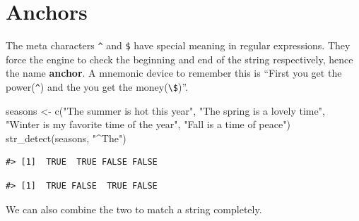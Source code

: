 \documentclass[
]{krantz}
\makeatletter
\newenvironment{Shaded}{\begin{snugshade}}{\end{snugshade}}
\newcommand{\FunctionTok}[1]{\textcolor[rgb]{0.00,0.00,0.00}{#1}}
\newcommand{\NormalTok}[1]{#1}
\newcommand{\OtherTok}[1]{\textcolor[rgb]{0.56,0.35,0.01}{#1}}
\newcommand{\StringTok}[1]{\textcolor[rgb]{0.31,0.60,0.02}{#1}}
\newenvironment{kframe}{%
\medskip{}
\setlength{\fboxsep}{.8em}
 \def\at@end@of@kframe{}%
 \ifinner\ifhmode%
  \def\at@end@of@kframe{\end{minipage}}%
  \begin{minipage}{\columnwidth}%
 \fi\fi%
 \def\FrameCommand##1{\hskip\@totalleftmargin \hskip-\fboxsep
 \colorbox{shadecolor}{##1}\hskip-\fboxsep
     \hskip-\linewidth \hskip-\@totalleftmargin \hskip\columnwidth}%
 \MakeFramed {\advance\hsize-\width
   \@totalleftmargin\z@ \linewidth\hsize
   \@setminipage}}%
 {\par\unskip\endMakeFramed%
 \at@end@of@kframe}
\renewenvironment{Shaded}{\begin{kframe}}{\end{kframe}}
\makeatother
\begin{document}
\hypertarget{anchors}{%
\section{Anchors}\label{anchors}}

The meta characters \texttt{\^{}} and \texttt{\$} have special meaning in regular expressions. They force the engine to check the beginning and end of the string respectively, hence the name \textbf{anchor}. A mnemonic device to remember this is ``First you get the power(\texttt{\^{}}) and the you get the money(\texttt{\textbackslash{}\$})''.

\begin{Shaded}
\begin{Highlighting}[]
\NormalTok{seasons }\OtherTok{\textless{}{-}} \FunctionTok{c}\NormalTok{(}\StringTok{"The summer is hot this year"}\NormalTok{,}
             \StringTok{"The spring is a lovely time"}\NormalTok{,}
             \StringTok{"Winter is my favorite time of the year"}\NormalTok{,}
             \StringTok{"Fall is a time of peace"}\NormalTok{)}
\FunctionTok{str\_detect}\NormalTok{(seasons, }\StringTok{"\^{}The"}\NormalTok{)}
\end{Highlighting}
\end{Shaded}

\begin{verbatim}
#> [1]  TRUE  TRUE FALSE FALSE
\end{verbatim}

\begin{Shaded}
\end{Shaded}

\begin{verbatim}
#> [1]  TRUE FALSE  TRUE FALSE
\end{verbatim}

We can also combine the two to match a string completely.

\begin{Shaded}
\end{Shaded}
\end{document}
